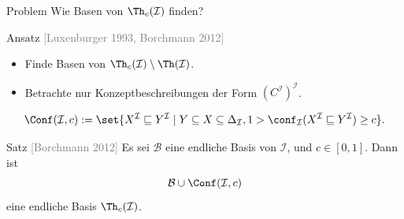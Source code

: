 \documentclass[ngerman]{beamer}
\newcommand{\pseudocite}[1]{\textcolor{gray}{[#1]}}
\begin{document}
\begin{frame}

  \onslide<+->

  \begin{block}{Problem}
    Wie Basen von $\Th_{c}(\mathcal{I})$ finden?
  \end{block}

  \onslide<+->

  \begin{block}{Ansatz \pseudocite{Luxenburger 1993, Borchmann 2012}}
    \begin{itemize}
    \item<+-> Finde Basen von $\Th_{c}(\mathcal{I}) \setminus \Th(\mathcal{I})$.
    \item<+-> Betrachte nur Konzeptbeschreibungen der Form $(C^{\mathcal{I}})^{\mathcal{I}}$.
    \end{itemize}
  \end{block}

  

  \onslide<+->

  \begin{Definition}
    \begin{equation*}
      \Conf(\mathcal{I}, c) := \set{ X^{\mathcal{I}} \sqsubseteq Y^{\mathcal{I}} \mid Y
        \subseteq X \subseteq \Delta_{\mathcal{I}}, 1 > \conf_{\mathcal{I}}(
        X^{\mathcal{I}} \sqsubseteq Y^{\mathcal{I}}) \ge c}.
    \end{equation*}
  \end{Definition}

  \onslide<+->

  \begin{block}{Satz \pseudocite{Borchmann 2012}}
    Es sei $\mathcal{B}$ eine endliche Basis von $\mathcal{I}$, und $c \in [0, 1]$.  Dann
    ist 
    \begin{equation*}
      \mathcal{B} \cup \Conf(\mathcal{I},c)
    \end{equation*}
    eine endliche Basis $\Th_c(\mathcal{I})$.
  \end{block}
  
\end{frame}
\end{document}
